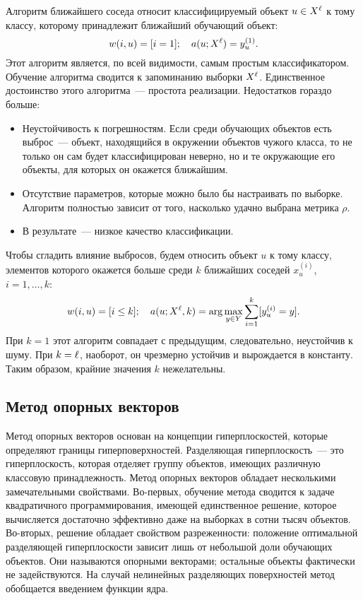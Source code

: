 Алгоритм ближайшего соседа относит классифицируемый объект \( u\in X^\ell \) к тому классу, которому
принадлежит ближайший обучающий объект:
\[
  w(i,u) = [i = 1]; \quad a(u; X^\ell)= y^{(1)}_u.
\]
Этот алгоритм является, по всей видимости, самым простым классификатором.
Обучение алгоритма сводится к запоминанию выборки \( X^\ell \). Единственное достоинство этого
алгоритма~--- простота реализации. Недостатков гораздо больше:
\begin{itemize}
  \item Неустойчивость к погрешностям. Если среди обучающих объектов есть выброс~--- объект, находящийся
    в окружении объектов чужого класса, то не только он сам будет классифицирован неверно, но и те
    окружающие его объекты, для которых он окажется ближайшим.
  \item Отсутствие параметров, которые можно было бы настраивать по выборке. Алгоритм полностью зависит
    от того, насколько удачно выбрана метрика \( \rho \).
  \item В результате~--- низкое качество классификации.
\end{itemize}

Чтобы сгладить влияние выбросов, будем относить объект \( u \) к тому классу, элементов которого окажется
больше среди \( k \) ближайших соседей \( x^{(i)}_u \), \( i = 1, \ldots, k \):
\[
  w(i, u) = [i\le k]; \quad a(u; X^\ell, k) = \arg\max_{y\in Y}\sum_{i = 1}^k[y^{(i)}_u = y].
\]
При \( k = 1 \) этот алгоритм совпадает с предыдущим, следовательно, неустойчив к шуму. При
\( k = \ell \), наоборот, он чрезмерно устойчив и вырождается в константу. Таким образом, крайние
значения \( k \) нежелательны.

\subsection{Метод опорных векторов}
Метод опорных векторов основан на концепции гиперплоскостей, которые определяют границы гиперповерхностей.
Разделяющая гиперплоскость~--- это гиперплоскость, которая отделяет группу объектов, имеющих различную
классовую принадлежность.
Метод опорных векторов обладает несколькими замечательными свойствами. Во-первых, обучение метода
сводится к задаче квадратичного программирования, имеющей единственное решение, которое вычисляется
достаточно эффективно даже на выборках в сотни тысяч объектов. Во-вторых, решение обладает свойством
разреженности: положение оптимальной разделяющей гиперплоскости зависит лишь от небольшой доли
обучающих объектов. Они называются опорными векторами; остальные объекты фактически не задействуются.
На случай нелинейных разделяющих поверхностей метод обобщается введением функции ядра.

